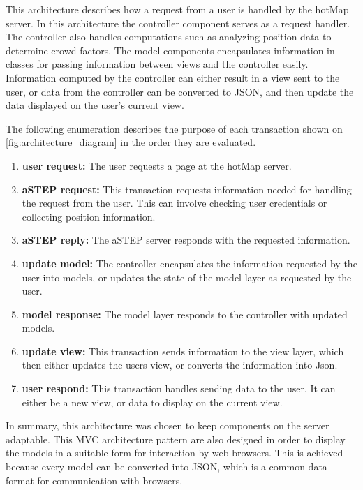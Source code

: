 
This architecture describes how a request from a user is handled by the hotMap server. In this architecture the controller component serves as a request handler. The controller also handles computations such as analyzing position data to determine crowd factors. The model components encapsulates information in classes for passing information between views and the controller easily. Information computed by the controller can either result in a view sent to the user, or data from the controller can be converted to JSON, and then update the data displayed on the user's current view. 


The following enumeration describes the purpose of each transaction shown on \cref{fig:architecture_diagram} in the order they are evaluated.

\begin{enumerate}
    \item \textbf{user request:} The user requests a page at the hotMap server.
    \item \textbf{aSTEP request:} This transaction requests information needed for handling the request from the user. This can involve checking user credentials or collecting position information.
    \item \textbf{aSTEP reply:} The aSTEP server responds with the requested information.
    \item \textbf{update model:} The controller encapsulates the information requested by the user into models, or updates the state of the model layer as requested by the user.
    \item \textbf{model response:} The model layer responds to the controller with updated models.
    \item \textbf{update view:} This transaction sends information to the view layer, which then either updates the users view, or converts the information into Json.
    \item \textbf{user respond:} This transaction handles sending data to the user. It can either be a new view, or data to display on the current view.
\end{enumerate}


In summary, this architecture was chosen to keep components on the server adaptable. This MVC architecture pattern are also designed in order to display the models in a suitable form for interaction by web browsers. This is achieved because every model can be converted into JSON, which is a common data format for communication with browsers.

